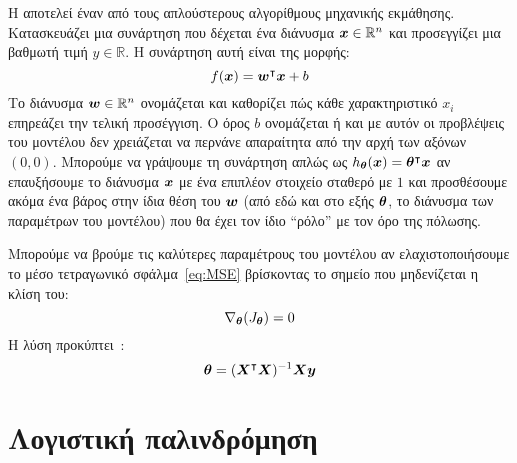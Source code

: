 Η  αποτελεί έναν από τους απλούστερους αλγορίθμους μηχανικής εκμάθησης.
Κατασκευάζει μια συνάρτηση που δέχεται ένα διάνυσμα $\vx \in \mathbb{R}^n$ και προσεγγίζει μια βαθμωτή τιμή $y \in \mathbb{R}$.
Η συνάρτηση αυτή είναι της μορφής:
\begin{equation}
    \label{eq:linear-regression}
    f(\vx) = \vw^\intercal \vx + b
\end{equation}
Το διάνυσμα $\vw \in \mathbb{R}^n$ ονομάζεται  και καθορίζει πώς κάθε χαρακτηριστικό $x_i$ επηρεάζει την τελική προσέγγιση.
Ο όρος $b$ ονομάζεται  ή  και με αυτόν οι προβλέψεις του μοντέλου δεν χρειάζεται να περνάνε απαραίτητα από την αρχή των αξόνων $(0, 0)$.
Μπορούμε να γράψουμε τη συνάρτηση απλώς ως $\hth(\vx) = \vth^\intercal \vx$ αν επαυξήσουμε το διάνυσμα $\vx$ με ένα επιπλέον στοιχείο σταθερό με $1$ και προσθέσουμε ακόμα ένα βάρος στην ίδια θέση του $\vw$
(από εδώ και στο εξής $\vth$, το διάνυσμα των παραμέτρων του μοντέλου)
που θα έχει τον ίδιο \enquote{ρόλο} με τον όρο της πόλωσης.

Μπορούμε να βρούμε τις καλύτερες παραμέτρους του μοντέλου αν ελαχιστοποιήσουμε το μέσο τετραγωνικό σφάλμα~\ref{eq:MSE} βρίσκοντας το σημείο που μηδενίζεται η κλίση του:
\begin{equation}
    \nabla_{\vth}(J_{\vth}) = 0
\end{equation}
Η λύση προκύπτει~\cite{goodfellow}:
\begin{equation}
    \vth = (\vX^\intercal \vX)^{-1} \vX \vec{y}
\end{equation}

\section{Λογιστική παλινδρόμηση}\label{sec:logistic-regression}

